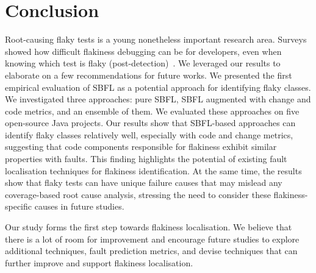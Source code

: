 \section{Conclusion}
\label{sec:sherloc-conclusion}

Root-causing flaky tests is a young nonetheless important research area. Surveys showed how difficult flakiness debugging can be for developers, even when knowing which test is flaky (post-detection)~\cite{Eck2019,Habchi2022Qualitative}. 
We leveraged our results to elaborate on a few recommendations for future works.
We presented the first empirical evaluation of SBFL as a potential approach for identifying flaky classes. We investigated three approaches: pure SBFL, SBFL augmented with change and code metrics, and an ensemble of them. 
We evaluated these approaches on five open-source Java projects. Our results show that SBFL-based approaches can identify flaky classes relatively well, especially with code and change metrics, suggesting that code components responsible for flakiness exhibit similar properties with faults. This finding highlights the potential of existing fault localisation techniques for flakiness identification. At the same time, the results show that flaky tests can have unique failure causes that may mislead any coverage-based root cause analysis, stressing the need to consider these flakiness-specific causes in future studies.

Our study forms the first step towards flakiness localisation. We believe that there is a lot of room for improvement and encourage future studies to explore additional techniques, fault prediction metrics, and devise techniques that can further improve and support flakiness localisation. 
